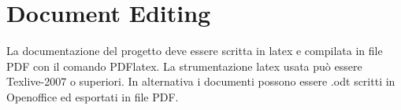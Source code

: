 \section{Document Editing}
La documentazione del progetto deve essere scritta in latex e compilata in file PDF con il comando PDFlatex. La strumentazione latex usata pu\`o essere Texlive-2007 o superiori.
In alternativa i documenti possono essere .odt scritti in Openoffice ed esportati in file PDF.